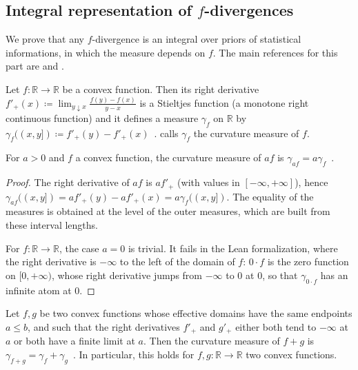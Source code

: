 \subsection{Integral representation of $f$-divergences}

We prove that any $f$-divergence is an integral over priors of statistical informations, in which the measure depends on $f$.
The main references for this part are \cite{liese2006divergences} and \cite{liese2012phi}.


\begin{definition}
  \label{def:curvatureMeasure}
  \leanok
  \uses{}
  Let $f: \mathbb{R} \to \mathbb{R}$ be a convex function. Then its right derivative $f'_+(x) \coloneqq \lim_{y \downarrow x}\frac{f(y) - f(x)}{y - x}$ is a Stieltjes function (a monotone right continuous function) and it defines a measure $\gamma_f$ on $\mathbb{R}$ by $\gamma_f((x,y]) \coloneqq f'_+(y) - f'_+(x)$~. \cite{liese2012phi} calls $\gamma_f$ the curvature measure of $f$.
\end{definition}


\begin{lemma}
  \label{lem:curvatureMeasure_mul}
  \leanok
  For $a > 0$ and $f$ a convex function, the curvature measure of $af$ is $\gamma_{af} = a \gamma_f$~.
\end{lemma}

\begin{proof}\leanok
\uses{}
The right derivative of $af$ is $a f'_+$ (with values in $[-\infty, +\infty]$), hence $\gamma_{af}((x,y]) = a f'_+(y) - a f'_+(x) = a \gamma_f((x,y])$. The equality of the measures is obtained at the level of the outer measures, which are built from these interval lengths.

For $f: \mathbb{R} \to \mathbb{R}$, the case $a = 0$ is trivial. It fails in the Lean formalization, where the right derivative is $-\infty$ to the left of the domain of $f$: $0 \cdot f$ is the zero function on $[0, +\infty)$, whose right derivative jumps from $-\infty$ to $0$ at $0$, so that $\gamma_{0 \cdot f}$ has an infinite atom at $0$.
\end{proof}


\begin{lemma}
  \label{lem:curvatureMeasure_add}
  \leanok
  Let $f,g$ be two convex functions whose effective domains have the same endpoints $a \le b$, and such that the right derivatives $f'_+$ and $g'_+$ either both tend to $-\infty$ at $a$ or both have a finite limit at $a$. Then the curvature measure of $f+g$ is $\gamma_{f+g} = \gamma_f + \gamma_g$~.
  In particular, this holds for $f,g: \mathbb{R} \to \mathbb{R}$ two convex functions.
\end{lemma}

